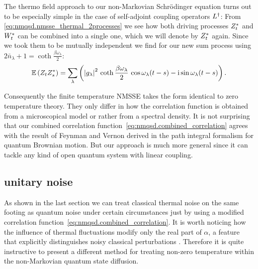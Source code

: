 The thermo field approach to our non-Markovian Schrödinger equation turns out to be especially simple in the case of self-adjoint coupling operators $L^\dagger$:
From \autoref{eq:nmqsd.nmsse_thermal_2processes} we see how both driving processes ${Z}^*_t$ and ${W}^*_t$ can be combined into a single one, which we will denote by ${Z}^*_t$ again.
Since we took them to be mutually independent we find for our new sum process using $2\bar n_\lambda + 1 = \coth{\frac{\beta\omega_\lambda}{2}}$:
\begin{equation}
  \E[Z_t \ZZ_s] = \sum_\lambda \left(\abs{g_\lambda}^2 \, \coth{\frac{\beta \omega_\lambda}{2}} \, \cos{\omega_\lambda (t-s)} - \ii \sin{\omega_\lambda (t-s)} \right).
  \label{eq:nmqsd.combined_correlation}
\end{equation}

Consequently the finite temperature NMSSE takes the form identical to zero temperature theory.
They only differ in how the correlation function is obtained from a microscopical model or rather from a spectral density.
It is not surprising that our combined correlation function~\ref{eq:nmqsd.combined_correlation} agrees with the result of Feynman and Vernon \cite{FeVe63_quantum_dissipative} derived in the path integral formalism for quantum Brownian motion.
But our approach is much more general since it can tackle any kind of open quantum system with linear coupling.

\subsection{unitary noise}
\label{sub:nmqsd.temperature.unitary}

As shown in the last section we can treat classical thermal noise on the same footing as quantum noise under certain circumstances just by using a modified correlation function~\ref{eq:nmqsd.combined_correlation}.
It is worth noticing how the influence of thermal fluctuations modify only the real part of $\alpha$, a feature that explicitly distinguishes noisy classical perturbations \cite{FeHi10_path_integrals}.
Therefore it is quite instructive to present a different method for treating non-zero temperature within the non-Markovian quantum state diffusion.

